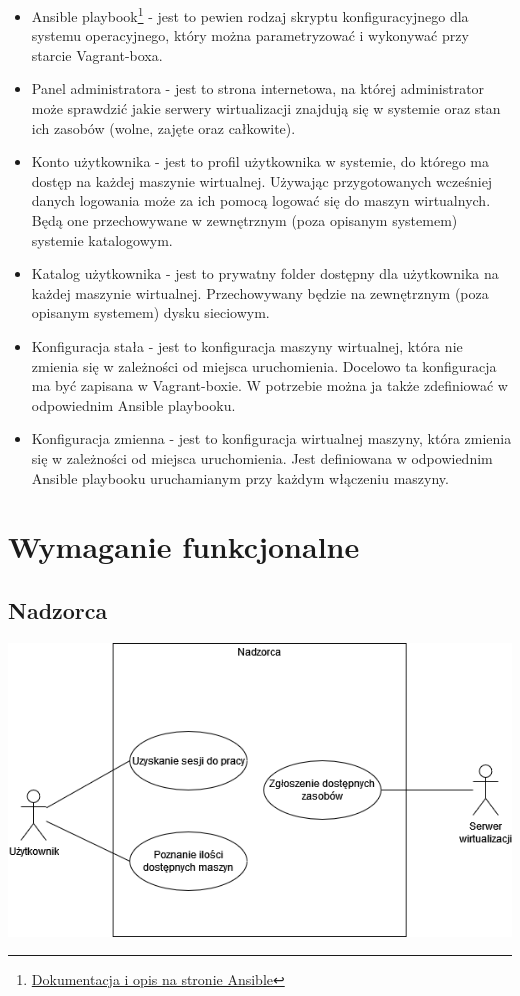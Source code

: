 \documentclass[12pt]{article}
\begin{document}
\begin{itemize}
	\item Ansible playbook\footnote{\href{https://www.redhat.com/en/topics/automation/what-is-an-ansible-playbook#example-of-ansible-playbook}{Dokumentacja i opis na stronie Ansible}} - jest to pewien rodzaj skryptu konfiguracyjnego dla systemu operacyjnego, który można parametryzować i wykonywać przy starcie Vagrant-boxa.
	\item Panel administratora - jest to strona internetowa, na której administrator może sprawdzić jakie serwery wirtualizacji znajdują się w systemie oraz stan ich zasobów (wolne, zajęte oraz całkowite). 
	\item Konto użytkownika - jest to profil użytkownika w systemie, do którego ma dostęp na każdej maszynie wirtualnej. Używając przygotowanych wcześniej danych logowania może za ich pomocą logować się do maszyn wirtualnych. Będą one przechowywane w zewnętrznym (poza opisanym systemem) systemie katalogowym.
	\item Katalog użytkownika - jest to prywatny folder dostępny dla użytkownika na każdej maszynie wirtualnej. Przechowywany będzie na zewnętrznym (poza opisanym systemem) dysku sieciowym.
	\item Konfiguracja stała - jest to konfiguracja maszyny wirtualnej, która nie zmienia się w zależności od miejsca uruchomienia. Docelowo ta konfiguracja ma być zapisana w Vagrant-boxie. W potrzebie można ja także zdefiniować w odpowiednim Ansible playbooku.
	\item Konfiguracja zmienna - jest to konfiguracja wirtualnej maszyny, która zmienia się w zależności od miejsca uruchomienia. Jest definiowana w odpowiednim Ansible playbooku uruchamianym przy każdym włączeniu maszyny.
\end{itemize}

\section{Wymaganie funkcjonalne}
\subsection{Nadzorca}
\includegraphics[width=\textwidth]{../diagrams/use_cases/overseer.png}
\end{document}

